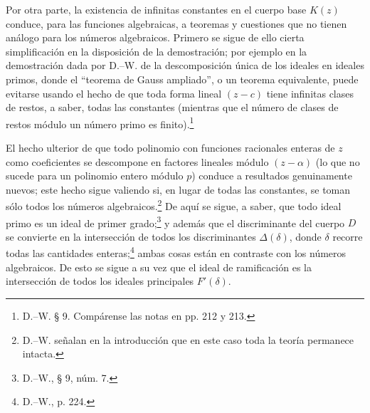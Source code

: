\documentclass[11pt]{article}
\begin{document}
Por otra parte, la existencia de infinitas constantes en el cuerpo base \(K(z)\) conduce, para las funciones algebraicas, a teoremas y cuestiones que no tienen análogo para los números algebraicos. Primero se sigue de ello cierta simplificación en la disposición de la demostración; por ejemplo en la demostración dada por D.--W. de la descomposición única de los ideales en ideales primos, donde el ``teorema de Gauss ampliado'', o un teorema equivalente, puede evitarse usando el hecho de que toda forma lineal \((z-c)\) tiene infinitas clases de restos, a saber, todas las constantes (mientras que el número de clases de restos módulo un número primo es finito).\footnote{D.--W. § 9. Compárense las notas en pp. 212 y 213.}

El hecho ulterior de que todo polinomio con funciones racionales enteras de \(z\) como coeficientes se descompone en factores lineales módulo \((z-\alpha)\) (lo que no sucede para un polinomio entero módulo \(p\)) conduce a resultados genuinamente nuevos; este hecho sigue valiendo si, en lugar de todas las constantes, se toman sólo todos los números algebraicos.\footnote{D.--W. señalan en la introducción que en este caso toda la teoría permanece intacta.} De aquí se sigue, a saber, que todo ideal primo es un ideal de primer grado;\footnote{D.--W., § 9, núm. 7.} y además que el discriminante del cuerpo \(D\) se convierte en la intersección de todos los discriminantes \(\Delta(\delta)\), donde \(\delta\) recorre todas las cantidades enteras;\footnote{D.--W., p. 224.} ambas cosas están en contraste con los números algebraicos. De esto se sigue a su vez que el ideal de ramificación es la intersección de todos los ideales principales \(F'(\delta)\).
\end{document}
